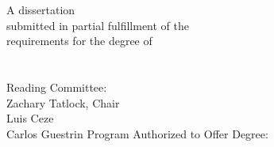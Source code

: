 
\begin{titlepage}
    \begin{center}
        \large
        \hfill
        \vfill
        \begingroup
            \color{thecolor} \\
            \color{thecolor} \\ \bigskip
        \endgroup
        \vfill
        A dissertation \\
        submitted in partial fulfillment of the \\
        requirements for the degree of \\
        \medskip
         \\
        \bigskip
         \\
        \smallskip
        \vfill
        Reading Committee: \\
        \smallskip
        Zachary Tatlock, Chair \\
        \smallskip
        Luis Ceze \\
        \smallskip
        Carlos Guestrin
        \vfill
        Program Authorized to Offer Degree: \\
        \smallskip
    \end{center}
    \restoregeometry
\end{titlepage}
